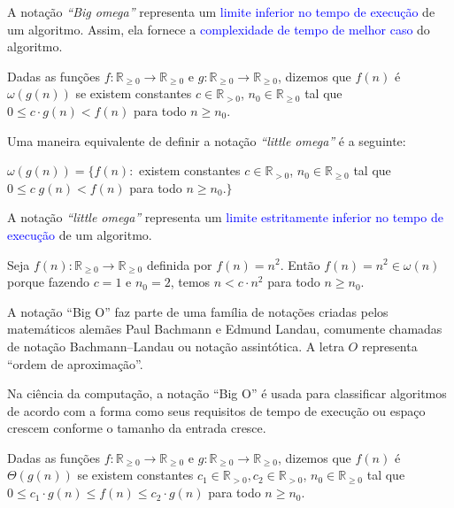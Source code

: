 A notação \textit{``Big omega''} representa um \textcolor{blue}{limite inferior no tempo de execução} de um algoritmo.  Assim, ela fornece a \textcolor{blue}{complexidade de tempo de melhor caso} do algoritmo.

\begin{defn} 
Dadas as funções $f:\mathbb{R}_{\geq 0}\rightarrow \mathbb{R}_{\geq 0}$ e $g:\mathbb{R}_{\geq 0}\rightarrow \mathbb{R}_{\geq 0}$, dizemos que $f(n)$ é $\omega(g(n))$ se existem constantes $c\in\mathbb{R}_{>0}$, $n_0\in \mathbb{R}_{\geq 0}$ tal que $0\leq c\cdot g(n) < f(n)$  para todo $n \geq n_0$. 
\end{defn}   \vspace{0.2cm}

Uma maneira equivalente de definir a notação \textit{``little omega''} é a seguinte:
\vspace{0.3cm}    

\begin{defn}
$\omega(g(n)) = \{ f(n):$ existem constantes $c\in\mathbb{R}_{>0}$, $n_0\in \mathbb{R}_{\geq 0}$ tal que $0 \leq c\; g(n) < f(n)$ para todo $n \geq n_0.\}$
\end{defn}\vspace{0.3cm}

A notação \textit{``little omega''}  representa um \textcolor{blue}{limite estritamente inferior no tempo de execução} de um algoritmo. 

\begin{exmp}
Seja $f(n):\mathbb{R}_{\geq 0}\rightarrow \mathbb{R}_{\geq 0}$ definida por $f(n) = n^2$. Então $f(n)=n^2 \in \omega(n)$ porque fazendo $c=1$ e $n_0=2$, temos $n < c\cdot n^2$ para todo $n\geq n_0$.
\end{exmp}

A notação ``Big O'' faz parte de uma família de notações criadas pelos matemáticos alemães Paul Bachmann e Edmund Landau, comumente chamadas de notação Bachmann–Landau ou notação assintótica.  
A letra $O$ representa ``ordem de aproximação''.
\vspace{0.5cm}

Na ciência da computação, a notação ``Big O'' é usada para classificar algoritmos de acordo com a forma como seus requisitos de tempo de execução ou espaço crescem conforme o tamanho da entrada cresce.   

\begin{defn} 
Dadas as funções $f:\mathbb{R}_{\geq 0}\rightarrow \mathbb{R}_{\geq 0}$ e $g:\mathbb{R}_{\geq 0}\rightarrow \mathbb{R}_{\geq 0}$, dizemos que $f(n)$ é $\Theta(g(n))$ se existem constantes $c_1\in\mathbb{R}_{>0},c_2\in\mathbb{R}_{>0}$, $n_0\in \mathbb{R}_{\geq 0}$ tal que $0\leq c_1\cdot g(n) \leq f(n) \leq c_2\cdot g(n)$  para todo $n \geq n_0$. 
\end{defn}   \vspace{0.2cm}

